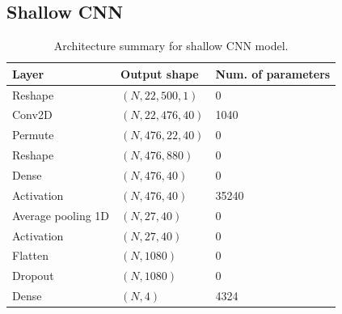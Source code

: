 \documentclass{article}
\begin{document}
\subsection{Shallow CNN}
\begin{table}[H]
\begin{center}
    \begin{tabular}{|l|l|l|}
        \hline
        Layer   & Output shape  & Num. of parameters \\
        \hline\hline
        Reshape             & $(N, 22, 500, 1)$     & 0     \\
        Conv2D              & $(N, 22, 476, 40)$    & 1040  \\
        Permute             & $(N, 476, 22, 40)$    & 0     \\
        Reshape             & $(N, 476, 880)$       & 0     \\
        Dense               & $(N, 476, 40)$        & 0     \\
        Activation          & $(N, 476, 40)$        & 35240 \\
        Average pooling 1D  & $(N, 27, 40)$         & 0     \\
        Activation          & $(N, 27, 40)$         & 0     \\
        Flatten             & $(N, 1080)$           & 0     \\
        Dropout             & $(N, 1080)$           & 0     \\
        Dense               & $(N, 4)$              & 4324  \\
        \hline
    \end{tabular}
\end{center}
\caption{Architecture summary for shallow CNN model.}
\label{tab:shallow}
\end{table}
\end{document}

